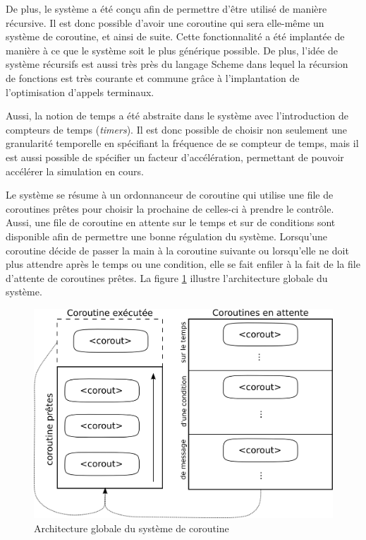 \documentclass[12pt,oneside,letterpaper,francais]{book}
\begin{document}
De plus, le système a été conçu afin de permettre d'être utilisé de
manière récursive. Il est donc possible d'avoir une coroutine qui sera
elle-même un système de coroutine, et ainsi de suite. Cette
fonctionnalité a été implantée de manière à ce que le système soit le
plus générique possible. De plus, l'idée de système récursifs est
aussi très près du langage Scheme dans lequel la récursion de
fonctions est très courante et commune grâce à l'implantation de
l'optimisation d'appels terminaux.

Aussi, la notion de temps a été abstraite dans le système avec
l'introduction de compteurs de temps (\textit{timers}). Il est donc
possible de choisir non seulement une granularité temporelle en
spécifiant la fréquence de se compteur de temps, mais il est aussi
possible de spécifier un facteur d'accélération, permettant de pouvoir
accélérer la simulation en cours.

Le système se résume à un ordonnanceur de coroutine qui utilise une
file de coroutines prêtes pour choisir la prochaine de celles-ci à
prendre le contrôle. Aussi, une file de coroutine en attente sur le
temps et sur de conditions sont disponible afin de permettre une bonne
régulation du système. Lorsqu'une coroutine décide de passer la main à
la coroutine suivante ou lorsqu'elle ne doit plus attendre après le
temps ou une condition, elle se fait enfiler à la fait de la file
d'attente de coroutines prêtes. La figure \ref{Corout:system-schema}
illustre l'architecture globale du système.

\begin{figure}[htb!]
  \center
  \includegraphics[scale=0.7]{corout-system}
  \caption{Architecture globale du système de coroutine}
  \label{Corout:system-schema}
\end{figure}
\end{document}
